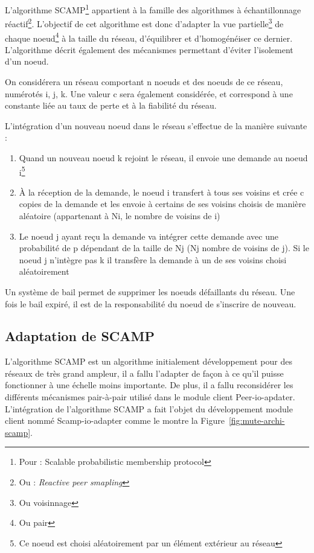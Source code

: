 \documentclass{tnreport}
\begin{document}
L'algorithme SCAMP\footnote{Pour : Scalable probabilistic membership protocol} appartient à la famille des algorithmes à échantillonnage réactif\footnote{Ou : \emph{Reactive peer smapling}}. L'objectif de cet algorithme est donc d'adapter la vue partielle\footnote{Ou voisinnage} de chaque noeud\footnote{Ou pair} à la taille du réseau, d'équilibrer et d'homogénéiser ce dernier. L'algorithme décrit également des mécanismes permettant d'éviter l'isolement d'un noeud.

On considérera un réseau comportant n noeuds et des noeuds de ce réseau, numérotés i, j, k. Une valeur c sera également considérée, et correspond à une constante liée au taux de perte et à la fiabilité du réseau.

L'intégration d'un nouveau noeud dans le réseau s'effectue de la manière suivante :
\begin{enumerate}
  \item Quand un nouveau noeud k rejoint le réseau, il envoie une demande au noeud i\footnote{Ce noeud est choisi aléatoirement par un élément extérieur au réseau}
  \item À la réception de la demande, le noeud i transfert à tous ses voisins et crée c copies de la demande et les envoie à certains de ses voisins choisis de manière aléatoire (appartenant à Ni, le nombre de voisins de i)
  \item Le noeud j ayant reçu la demande va intégrer cette demande avec une probabilité de p dépendant de la taille de Nj (Nj nombre de voisins de j). Si le noeud j n'intègre pas k il transfère la demande à un de ses voisins choisi aléatoirement\\
\end{enumerate}

 Un système de bail permet de supprimer les noeuds défaillants du réseau. Une fois le bail expiré, il est de la responsabilité du noeud de s'inscrire de nouveau.

\subsection{Adaptation de SCAMP}

L'algorithme SCAMP est un algorithme initialement développement pour des réseaux de très grand ampleur, il a fallu l'adapter de façon à ce qu'il puisse fonctionner à une échelle moins importante. De plus, il a fallu reconsidérer les différents mécanismes pair-à-pair utilisé dans le module client Peer-io-apdater. L'intégration de l'algorithme SCAMP a fait l'objet du développement module client nommé Scamp-io-adapter comme le montre la Figure~\ref{fig:mute-archi-scamp}.
\end{document}
